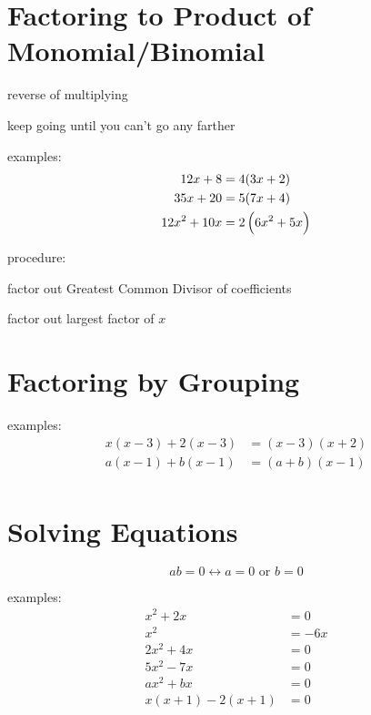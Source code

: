 \documentclass[letterpaper, landscape]{exam}
\begin{document}
  \section{Factoring to Product of Monomial/Binomial}

  \begin{itemize*}
    \item reverse of multiplying
    \item keep going until you can't go any farther
  \end{itemize*}

  examples:
  \begin{align*}
    12x + 8     & = 4(3x + 2) \\
    35x + 20    & = 5(7x + 4) \\
    12x^2 + 10x & = 2 \del{ 6x^2 + 5x }
  \end{align*}

  procedure:
  \begin{itemize*}
    \item factor out Greatest Common Divisor of coefficients
    \item factor out largest factor of $x$
  \end{itemize*}

  \section{Factoring by Grouping} %
  
  examples:
  \begin{align*}
    x(x - 3) + 2(x - 3) & = (x - 3)(x + 2) \\
    a(x - 1) + b(x - 1) & = (a + b)(x - 1) \\
  \end{align*}

  \section{Solving Equations} %
  \[
    ab = 0 \leftrightarrow a = 0 \text{ or } b = 0
  \]
  
  examples:
  \begin{align*}
    x^2 + 2x            & = 0 \\
    x^2                 & = -6x \\
    2x^2 + 4x           & = 0 \\
    5x^2 - 7x           & = 0 \\
    ax^2 + bx           & = 0 \\
    x(x + 1) - 2(x + 1) & = 0 \\
  \end{align*}
  
\end{document}
